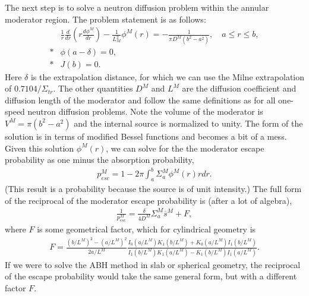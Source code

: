 The next step is to solve a neutron diffusion problem within the annular moderator region. The problem statement is as follows:
\begin{subequations}
\begin{align}
  &\frac{1}{r} \frac{d}{dr} \left( r \frac{d\phi^M}{dr} \right) - \frac{1}{L_M^2} \phi^M(r) = -\frac{1}{\pi D^M (b^2 - a^2)} , \quad a \le r \le b, \\*
  &\phi(a-\delta) = 0, \\*
  &J(b) = 0.
\end{align}
\end{subequations}
Here $\delta$ is the extrapolation distance, for which we can use the Milne extrapolation of $0.7104/\Sigma_{tr}$. The other quantities $D^M$ and $L^M$ are the diffusion coefficient and diffusion length of the moderator and follow the same definitions as for all one-speed neutron diffusion problems. Note the volume of the moderator is $V^M = \pi ( b^2 - a^2 )$ and the internal source is normalized to unity. The form of the solution is in terms of modified Bessel functions and becomes a bit of a mess. Given this solution $\phi^M(r)$, we can solve for the the moderator escape probability as one minus the absorption probability,
\begin{align}
  p_{esc}^M = 1 - 2\pi \int_a^b \Sigma_a^M \phi^M(r) r dr .
\end{align}
(This result is a probability because the source is of unit intensity.) The full form of the reciprocal of the moderator escape probability is (after a lot of algebra),
\begin{align}
 \frac{1}{p_{esc}^M} = \frac{\delta}{4 D^M} \Sigma_a^M \overline{s}^M + F,
\end{align}
where $F$ is some geometrical factor, which for cylindrical geometry is
\begin{align}
  F = \frac{ (b/L^M)^2 - (a/L^M)^2 }{ 2 a/L^M } \frac{ I_0(a/L^M) K_1(b/L^M) + K_0(a/L^M) I_1(b/L^M) }{ I_1(b/L^M) K_1(a/L^M) - K_1(b/L^M) I_1(a/L^M) } .
\end{align}
If we were to solve the ABH method in slab or spherical geometry, the reciprocal of the escape probability would take the same general form, but with a different factor $F$.

